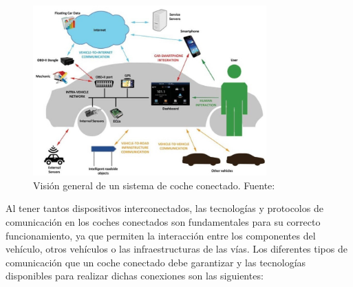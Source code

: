 \documentclass[12pt]{report} %
\begin{document}
\begin{figure}[H]
    \centering
    \includegraphics[width=0.8\textwidth]{connected_car_system.jpg}
	\caption{Visión general de un sistema de coche conectado. Fuente: \cite{mobileIntegration}}
    \label{fig:imagen4}
\end{figure}

Al tener tantos dispositivos interconectados, las tecnologías y protocolos de comunicación en los coches conectados son fundamentales para su correcto funcionamiento, ya que permiten la interacción entre los componentes del vehículo, otros vehículos o las infraestructuras de las vías. Los diferentes tipos de comunicación que un coche conectado debe garantizar y las tecnologías disponibles para realizar dichas conexiones son las siguientes: 
\end{document}
